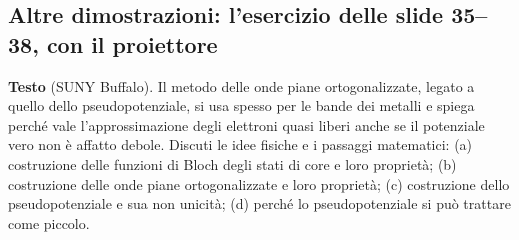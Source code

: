 \documentclass[11pt,a4paper]{article}
\begin{document}
\subsection{Altre dimostrazioni: l'esercizio delle slide 35--38, con il proiettore}\label{sec:pseudoes}
\textbf{Testo} (SUNY Buffalo). Il metodo delle onde piane ortogonalizzate, legato a quello dello pseudopotenziale, si usa spesso per le bande dei
metalli e spiega perché vale l'approssimazione degli elettroni quasi liberi anche se il potenziale vero non è affatto debole. Discuti le idee fisiche e
i passaggi matematici: (a) costruzione delle funzioni di Bloch degli stati di core e loro proprietà; (b) costruzione delle onde piane ortogonalizzate e
loro proprietà; (c) costruzione dello pseudopotenziale e sua non unicità; (d) perché lo pseudopotenziale si può trattare come piccolo.
\end{document}
